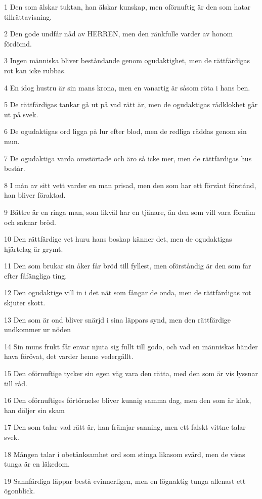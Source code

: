 \par 1 Den som älskar tuktan, han älskar kunskap, men oförnuftig är den som hatar tillrättavisning.
\par 2 Den gode undfår nåd av HERREN, men den ränkfulle varder av honom fördömd.
\par 3 Ingen människa bliver beståndande genom ogudaktighet, men de rättfärdigas rot kan icke rubbas.
\par 4 En idog hustru är sin mans krona, men en vanartig är såsom röta i hans ben.
\par 5 De rättfärdigas tankar gå ut på vad rätt är, men de ogudaktigas rådklokhet går ut på svek.
\par 6 De ogudaktigas ord ligga på lur efter blod, men de redliga räddas genom sin mun.
\par 7 De ogudaktiga varda omstörtade och äro så icke mer, men de rättfärdigas hus består.
\par 8 I mån av sitt vett varder en man prisad, men den som har ett förvänt förstånd, han bliver föraktad.
\par 9 Bättre är en ringa man, som likväl har en tjänare, än den som vill vara förnäm och saknar bröd.
\par 10 Den rättfärdige vet huru hans boskap känner det, men de ogudaktigas hjärtelag är grymt.
\par 11 Den som brukar sin åker får bröd till fyllest, men oförståndig är den som far efter fåfängliga ting.
\par 12 Den ogudaktige vill in i det nät som fångar de onda, men de rättfärdigas rot skjuter skott.
\par 13 Den som är ond bliver snärjd i sina läppars synd, men den rättfärdige undkommer ur nöden
\par 14 Sin muns frukt får envar njuta sig fullt till godo, och vad en människas händer hava förövat, det varder henne vedergällt.
\par 15 Den oförnuftige tycker sin egen väg vara den rätta, med den som är vis lyssnar till råd.
\par 16 Den oförnuftiges förtörnelse bliver kunnig samma dag, men den som är klok, han döljer sin skam
\par 17 Den som talar vad rätt är, han främjar sanning, men ett falskt vittne talar svek.
\par 18 Mången talar i obetänksamhet ord som stinga likasom svärd, men de visas tunga är en läkedom.
\par 19 Sannfärdiga läppar bestå evinnerligen, men en lögnaktig tunga allenast ett ögonblick.
